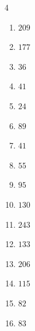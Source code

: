 \begin{multicols}{4}
\begin{enumerate}
  \item $209$


  \item $177$


  \item $36$


\columnbreak %

  \item $41$


  \item $24$


  \item $89$


  \item $41$


  \item $55$


  \item $95$


  \item $130$


  \item $243$


  \item $133$


  \item $206$


  \item $115$


  \item $82$


  \item $83$


\end{enumerate}
\end{multicols}
